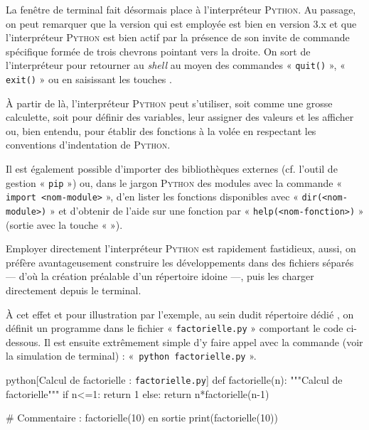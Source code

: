 La fenêtre de terminal fait désormais place à l'interpréteur \textsc{Python}. Au passage, on peut remarquer que la version qui est employée est bien en version 3.x et que l'interpréteur \textsc{Python} est bien actif par la présence de son invite de commande spécifique formée de trois chevrons pointant vers la droite. On sort de l'interpréteur pour retourner au \textit{shell} au moyen des commandes « \texttt{quit()} », « \texttt{exit()} » ou en saisissant les touches .

À partir de là, l'interpréteur \textsc{Python} peut s'utiliser, soit comme une grosse calculette, soit pour définir des variables, leur assigner des valeurs et les afficher ou, bien entendu, pour établir des fonctions à la volée en respectant les conventions d'indentation de \textsc{Python}.


Il est également possible d'importer des bibliothèques externes (cf. l'outil de gestion « \texttt{pip} ») ou, dans le jargon \textsc{Python} des modules avec la commande « \texttt{import <nom-module>} », d'en lister les fonctions disponibles avec « \texttt{dir(<nom-module>)} » et d'obtenir de l'aide sur une fonction par « \texttt{help(<nom-fonction>)} » (sortie avec la touche «  »).

Employer directement l'interpréteur \textsc{Python} est rapidement fastidieux, aussi, on préfère avantageusement construire les développements dans des fichiers séparés --- d'où la création préalable d'un répertoire idoine ---, puis les charger directement depuis le terminal. 

À cet effet et pour illustration par l'exemple, au sein dudit répertoire dédié , on définit un programme dans le fichier « \texttt{factorielle.py} » comportant le code ci-dessous. Il est ensuite extrêmement simple d'y faire appel avec la commande (voir la simulation de terminal) : «~\texttt{python factorielle.py} ».

\begin{code}{python}[\label{code:X.4}Calcul de factorielle : \texttt{factorielle.py}] 
def factorielle(n):
  """Calcul de factorielle"""
  if n<=1:
    return 1
  else:
    return n*factorielle(n-1)

# Commentaire : factorielle(10) en sortie
print(factorielle(10))
\end{code}

